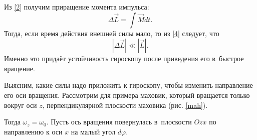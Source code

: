 \documentclass[a4paper,12pt]{article}
\theoremstyle{plain} %
\theoremstyle{definition} %
\theoremstyle{remark} %
\begin{document}
Из \eqref{2} получим приращение момента импульса:
\begin{equation}
\Delta \vec{L} = \int\!\vec{M} dt.
\label{4}
\end{equation}
Тогда, если время действия внешней силы мало, то из \eqref{4} следует, что
\begin{equation}
|\Delta \vec{L}| \ll |\vec{L}|.
\label{5}
\end{equation}
Именно это придаёт устойчивость гироскопу после приведения его в~быстрое вращение.

Выясним, какие силы надо приложить к гироскопу, чтобы изменить направление его оси вращения. Рассмотрим для примера маховик, который вращается только вокруг оси $z$, перпендикулярной плоскости маховика (рис. \ref{mah}).

Тогда $\omega_z = \omega_0$. Пусть ось вращения повернулась в~плоскости $Ozx$ по направлению к оси $x$ на малый угол $d \varphi$.
\end{document}
